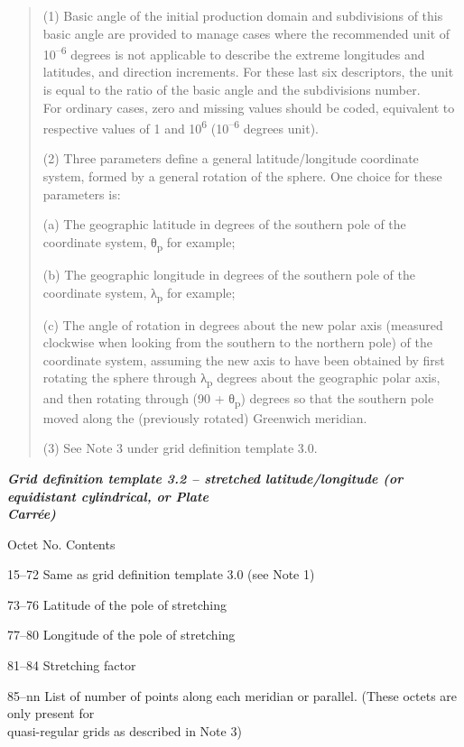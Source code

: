 \begin{quote}
(1) Basic angle of the initial production domain and subdivisions of this basic angle are provided to manage cases where the recommended unit of 10\textsuperscript{--6} degrees is not applicable to describe the extreme longitudes and latitudes, and direction increments. For these last six descriptors, the unit is equal to the ratio of the basic angle and the subdivisions number.\\
For ordinary cases, zero and missing values should be coded, equivalent to respective values of 1 and 10\textsuperscript{6} (10\textsuperscript{--6} degrees unit).

(2) Three parameters define a general latitude/longitude coordinate system, formed by a general rotation of the sphere. One choice for these parameters is:

(a) The geographic latitude in degrees of the southern pole of the coordinate system, θ\textsubscript{p} for example;

(b) The geographic longitude in degrees of the southern pole of the coordinate system, λ\textsubscript{p} for example;

(c) The angle of rotation in degrees about the new polar axis (measured clockwise when looking from the southern to the northern pole) of the coordinate system, assuming the new axis to have been obtained by first rotating the sphere through λ\textsubscript{p} degrees about the geographic polar axis, and then rotating through (90 + θ\textsubscript{p}) degrees so that the southern pole moved along the (previously rotated) Greenwich meridian.

(3) See Note 3 under grid definition template 3.0.
\end{quote}

\emph{\textbf{Grid definition template 3.2 -- stretched latitude/longitude (or equidistant cylindrical, or Plate\\
Carrée)}}

Octet No. Contents

15--72 Same as grid definition template 3.0 (see Note 1)

73--76 Latitude of the pole of stretching

77--80 Longitude of the pole of stretching

81--84 Stretching factor

85--nn List of number of points along each meridian or parallel. (These octets are only present for\\
quasi-regular grids as described in Note 3)

